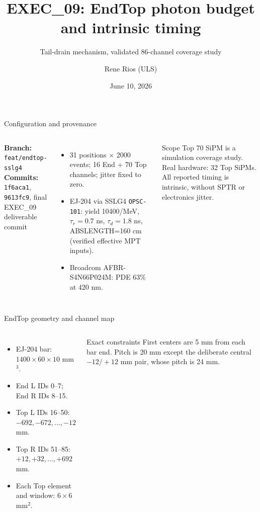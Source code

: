 \documentclass[aspectratio=169]{beamer}
\title{EXEC\_09: EndTop photon budget and intrinsic timing}
\subtitle{Tail-drain mechanism, validated 86-channel coverage study}
\author{Rene Rios (ULS)}
\date{June 10, 2026}
\begin{document}
\begin{frame}{Configuration and provenance}

\begin{columns}[T]
\textbf{Branch:} \texttt{feat/endtop-sslg4}\\
\textbf{Commits:} \texttt{1f6aca1}, \texttt{9613fc9}, final EXEC\_09 deliverable commit
\begin{itemize}\small
  \item 31 positions $\times$ 2000 events; 16 End + 70 Top channels; jitter fixed to zero.
  \item EJ-204 via SSLG4 \texttt{OPSC-101}: yield 10400/MeV, $\tau_r=0.7$ ns,
        $\tau_d=1.8$ ns, ABSLENGTH=160 cm (verified effective MPT inputs).
  \item Broadcom AFBR-S4N66P024M: PDE 63\% at 420 nm.
\end{itemize}
\begin{alertblock}{Scope}
Top 70 SiPM is a simulation coverage study. Real hardware: 32 Top SiPMs.
All reported timing is intrinsic, without SPTR or electronics jitter.
\end{alertblock}
\end{columns}

\end{frame}
\begin{frame}{EndTop geometry and channel map}

\begin{columns}[T]
\begin{itemize}
 \item EJ-204 bar: $1400\times60\times10$ mm$^3$.
 \item End L IDs 0--7; End R IDs 8--15.
 \item Top L IDs 16--50: $-692,-672,\ldots,-12$ mm.
 \item Top R IDs 51--85: $+12,+32,\ldots,+692$ mm.
 \item Each Top element and window: $6\times6$ mm$^2$.
\end{itemize}
\begin{block}{Exact constraints}
First centers are 5 mm from each bar end. Pitch is 20 mm except the deliberate
central $-12/+12$ mm pair, whose pitch is 24 mm.
\end{block}
\end{columns}

\end{frame}
\end{document}
